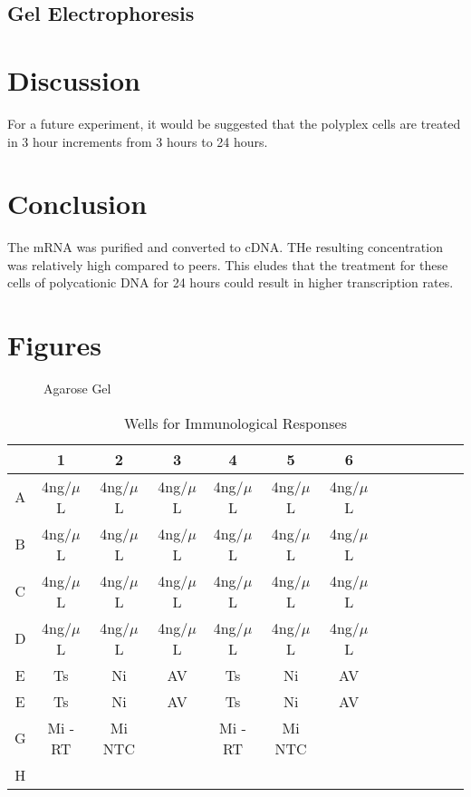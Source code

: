 \documentclass[journal, a4paper]{IEEEtran}
\begin{document}
  \subsection{Gel Electrophoresis}
    

\section{Discussion}

For a future experiment, it would be suggested that the polyplex cells are treated in 3 hour increments from 3 hours to 24 hours.

\section{Conclusion}
The mRNA was purified and converted to cDNA. THe resulting concentration was relatively high compared to peers. This eludes that the
treatment for these cells of polycationic DNA for 24 hours could result in higher transcription rates.

\section{Figures}

  \begin{figure}[t]
    \centering
    \caption{Agarose Gel}
    \label{fig:mesh1}
  \end{figure}

  \begin{table}[!hbt]
    \begin{center}
    \caption{Wells for Immunological Responses}
    \label{tab:simParameters}
    \begin{tabular}{|c|c|c|c|c|c|c|c|c|c|c|c|c|}
      \hline
      & 1 & 2 & 3 & 4 & 5 & 6\\
      \hline
      A & 4ng/$\mu$L & 4ng/$\mu$L & 4ng/$\mu$L & 4ng/$\mu$L & 4ng/$\mu$L & 4ng/$\mu$L\\
      \hline
      B & 4ng/$\mu$L & 4ng/$\mu$L & 4ng/$\mu$L & 4ng/$\mu$L & 4ng/$\mu$L & 4ng/$\mu$L\\
      \hline
      C & 4ng/$\mu$L & 4ng/$\mu$L & 4ng/$\mu$L & 4ng/$\mu$L & 4ng/$\mu$L & 4ng/$\mu$L\\
      \hline
      D & 4ng/$\mu$L & 4ng/$\mu$L & 4ng/$\mu$L & 4ng/$\mu$L & 4ng/$\mu$L & 4ng/$\mu$L\\
      \hline
      E & Ts & Ni & AV & Ts & Ni & AV\\
      \hline
      E & Ts & Ni & AV & Ts & Ni & AV\\
      \hline
      G & Mi -RT & Mi NTC & & Mi -RT & Mi NTC & \\
      \hline
      H & & & & & &\\
      \hline
    \end{tabular}
    \end{center}
  \end{table}
\end{document}

